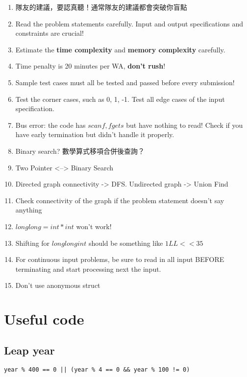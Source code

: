 \documentclass[10pt,oneside]{article}
\begin{document}
\begin{landscape}
\begin{multicols}{2}
\begin{enumerate}
	\item 隊友的建議，要認真聽！通常隊友的建議都會突破你盲點
	\item Read the problem statements carefully. Input and output specifications and constraints are crucial!
	\item Estimate the \textbf{time complexity} and \textbf{memory complexity} carefully.
	\item Time penalty is 20 minutes per WA, \textbf{don't rush}!
	\item Sample test cases must all be tested and passed before every submission!
	\item Test the corner cases, such as 0, 1, -1. Test all edge cases of the input specification.
	\item Bus error: the code has $scanf, fgets$ but have nothing to read! Check if you have early termination but didn't handle it properly.
	\item Binary search? 數學算式移項合併後查詢？
	\item Two Pointer <--> Binary Search
	\item Directed graph connectivity -> DFS. Undirected graph -> Union Find
	\item Check connectivity of the graph if the problem statement doesn't say anything
	\item $long long = int * int$ won't work!
	\item Shifting for $long long int$ should be something like $1LL << 35$
	\item For continuous input problems, be sure to read in all input BEFORE terminating and start processing next the input.
	\item Don't use anonymous struct
\end{enumerate}


\section{Useful code}

\subsection{Leap year}

\begin{lstlisting}
year % 400 == 0 || (year % 4 == 0 && year % 100 != 0)
\end{lstlisting}


\end{multicols}
\end{landscape}
\end{document}
